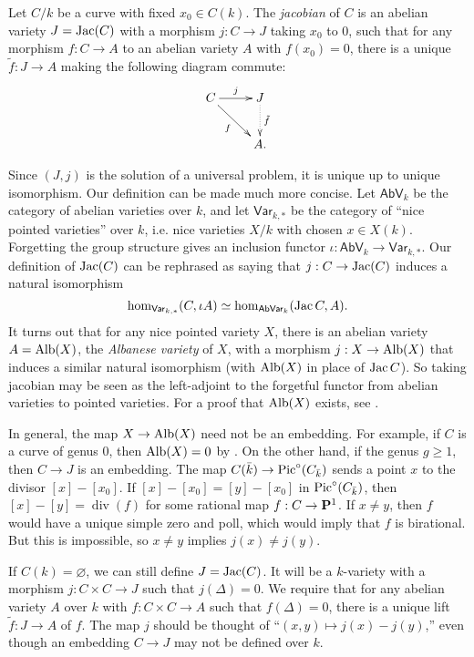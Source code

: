 \begin{definition}[Albanese]
Let $C/k$ be a curve with fixed $x_0\in C(k)$. The \emph{jacobian} of $C$ is 
an abelian variety $J=\operatorname{Jac}(C)$ with a morphism $j:C\to J$ taking $x_0$ to $0$, such 
that for any morphism $f:C\to A$ to an abelian variety $A$ with $f(x_0)=0$, 
there is a unique $\tilde f:J\to A$ making the following diagram commute:
\[\xymatrix{
  C \ar[r]^-j \ar[dr]_-f 
    & J \ar@{.>}[d]^-{\tilde f} \\
  & A .
}\]
\end{definition}

Since $(J,j)$ is the solution of a universal problem, it is unique up to 
unique isomorphism. Our definition can be made much more concise. Let 
$\mathsf{AbV}_k$ be the category of abelian varieties over $k$, and let 
$\mathsf{Var}_{k,\ast}$ be the category of ``nice pointed varieties'' over $k$, 
i.e. nice varieties $X/k$ with chosen $x\in X(k)$. Forgetting the group 
structure gives an inclusion functor 
$\iota:\mathsf{AbV}_k\to \mathsf{Var}_{k,\ast}$. Our definition of $\operatorname{Jac}(C)$ 
can be rephrased as saying that $j:C\to \operatorname{Jac}(C)$ induces a natural isomorphism 
\[
  \hom_{\mathsf{Var}_{k,\ast}}(C,\iota A) \simeq \hom_{\mathsf{AbVar}_k}(\operatorname{Jac} C,A) .
\]
It turns out that for any nice pointed variety $X$, there is an abelian variety 
$A=\operatorname{Alb}(X)$, the \emph{Albanese variety} of $X$, with a morphism 
$j:X\to \operatorname{Alb}(X)$ that induces a similar natural isomorphism (with 
$\operatorname{Alb}(X)$ in place of $\operatorname{Jac} C$). So taking jacobian may be seen 
as the left-adjoint to the forgetful functor from abelian varieties to pointed 
varieties. For a proof that $\operatorname{Alb}(X)$ exists, see \cite[A.11]{mo12}.

In general, the map $X\to \operatorname{Alb}(X)$ need not be an embedding. 
For example, if $C$ is a curve of genus $0$, then $\operatorname{Alb}(X)=0$ by 
\cite[I.3.9]{mi-av}. On the other hand, if the genus $g\geqslant 1$, then 
$C\to J$ is an embedding. The map $C(\bar k)\to \operatorname{Pic}^\circ(C_{\bar k})$ sends 
a point $x$ to the divisor $[x]-[x_0]$. If $[x]-[x_0] = [y]-[x_0]$ in 
$\operatorname{Pic}^\circ(C_{\bar k})$, then $[x]-[y] = \operatorname{div}(f)$ for some 
rational map $f:C\to \mathbf{P}^1$. If $x\ne y$, then $f$ would have a unique simple 
zero and poll, which would imply that $f$ is birational. But this is 
impossible, so $x\ne y$ implies $j(x)\ne j(y)$. 

If $C(k)=\varnothing$, we can still define $J=\operatorname{Jac}(C)$. It will be a $k$-variety 
with a morphism $j:C\times C\to J$ such that $j(\Delta)=0$. We require 
that for any abelian variety $A$ over $k$ with $f:C\times C\to A$ such that 
$f(\Delta)=0$, there is a unique lift $\tilde f:J\to A$ of $f$. The map $j$ 
should be thought of ``$(x,y)\mapsto j(x)-j(y)$,'' even though an embedding 
$C\to J$ may not be defined over $k$. 





